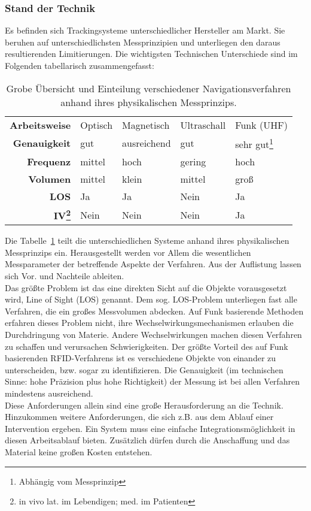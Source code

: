 \subsubsection{Stand der Technik}
Es befinden sich Trackingsysteme unterschiedlicher Hersteller am Markt. Sie beruhen auf unterschiedlichsten Messprinzipien und unterliegen den daraus resultierenden Limitierungen. Die wichtigsten Technischen Unterschiede sind im Folgenden tabellarisch zusammengefasst:
%
\begin{table} [H]
	\begin{center}
		\begin{tabular}{rllll}
			\textbf{Arbeitsweise} & Optisch & Magnetisch & Ultraschall & Funk (UHF) \\
			\textbf{Genauigkeit} & gut & ausreichend & gut & sehr gut\footnote{Abhängig vom Messprinzip} \\
			\textbf{Frequenz} & mittel & hoch & gering & hoch \\
			\textbf{Volumen} & mittel & klein & mittel & groß \\
			\textbf{LOS} & Ja & Ja & Nein & Ja \\
			\textbf{IV\footnote{in vivo lat. im Lebendigen; med. im Patienten}} & Nein   & Nein & Nein & Ja \\
%			
		\end{tabular}
	\end{center}
	\caption[Übersicht Navigationsverfahren]{Grobe Übersicht und Einteilung verschiedener Navigationsverfahren anhand ihres physikalischen Messprinzips.}
	\label{tab:overview_tracking}
\end{table}
%
Die Tabelle~\ref{tab:overview_tracking} teilt die unterschiedlichen Systeme anhand ihres physikalischen Messprinzips ein. Herausgestellt werden vor Allem die wesentlichen Messparameter der betreffende Aspekte der Verfahren. Aus der Auflistung lassen sich Vor. und Nachteile ableiten.\\
Das größte Problem ist das eine direkten Sicht auf die Objekte vorausgesetzt wird, Line of Sight (LOS) genannt. Dem sog. LOS-Problem unterliegen fast alle Verfahren, die ein großes Messvolumen abdecken. Auf Funk basierende Methoden erfahren dieses Problem nicht, ihre Wechselwirkungsmechanismen erlauben die Durchdringung von Materie. Andere Wechselwirkungen machen diesen Verfahren zu schaffen und verursachen Schwierigkeiten. Der größte Vorteil des auf Funk basierenden RFID-Verfahrens ist es verschiedene Objekte von einander zu unterscheiden, bzw. sogar zu identifizieren. Die Genauigkeit (im technischen Sinne: hohe Präzision plus hohe Richtigkeit) der Messung ist bei allen Verfahren mindestens ausreichend. \\
Diese Anforderungen allein sind eine große Herausforderung an die Technik. Hinzukommen weitere Anforderungen, die sich z.B. aus dem Ablauf einer Intervention ergeben. Ein System muss eine einfache Integrationsmöglichkeit in diesen Arbeitsablauf bieten. Zusätzlich dürfen durch die Anschaffung und das Material keine großen Kosten entstehen.\\
%
